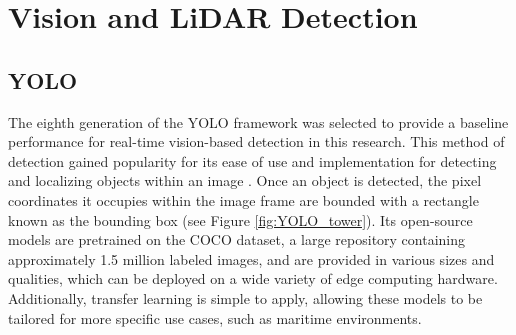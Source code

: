 \documentclass{erauthesis}
\begin{document}


\section{Vision and LiDAR Detection}
\subsection{YOLO} \label{yolo}

The eighth generation of the \ac{YOLO} framework was selected to provide a baseline performance for real-time vision-based detection in this research. 
This method of detection gained popularity for its ease of use and implementation for detecting and localizing objects within an image \cite{terven2023}.
Once an object is detected, the pixel coordinates it occupies within the image frame are bounded with a rectangle known as the bounding box (see Figure \ref{fig:YOLO_tower}).
Its open-source models are pretrained on the COCO dataset, a large repository containing approximately 1.5 million labeled images, and are provided in various sizes and qualities, which can be deployed on a wide variety of edge computing hardware.
Additionally, transfer learning is simple to apply, allowing these models to be tailored for more specific use cases, such as maritime environments.
\end{document}
